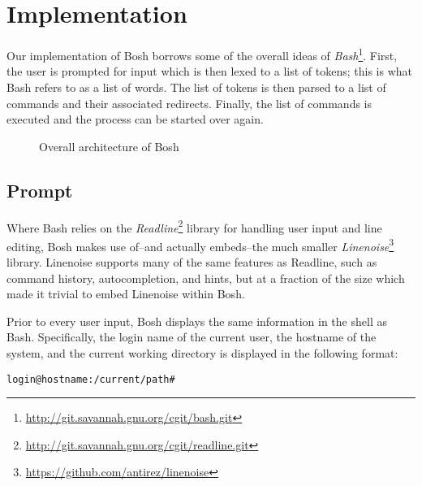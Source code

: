 \section{Implementation}
\label{sec:implementation}

Our implementation of Bosh borrows some of the overall ideas of \textit{Bash}\footnote{\url{http://git.savannah.gnu.org/cgit/bash.git}}. First, the user is prompted for input which is then lexed to a list of tokens; this is what Bash refers to as a list of words. The list of tokens is then parsed to a list of commands and their associated redirects. Finally, the list of commands is executed and the process can be started over again.

\begin{figure}[ht]
  \centering

  \caption{Overall architecture of Bosh}
  \label{fig:architecture}
\end{figure}

\subsection{Prompt}

Where Bash relies on the \textit{Readline}\footnote{\url{http://git.savannah.gnu.org/cgit/readline.git}} library for handling user input and line editing, Bosh makes use of--and actually embeds--the much smaller \textit{Linenoise}\footnote{\url{https://github.com/antirez/linenoise}} library. Linenoise supports many of the same features as Readline, such as command history, autocompletion, and hints, but at a fraction of the size which made it trivial to embed Linenoise within Bosh.

Prior to every user input, Bosh displays the same information in the shell as Bash. Specifically, the login name of the current user, the hostname of the system, and the current working directory is displayed in the following format:

\begin{lstlisting}
login@hostname:/current/path#
\end{lstlisting}


